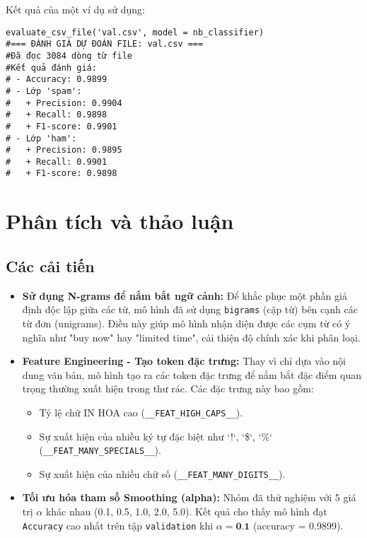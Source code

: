 Kết quả của một ví dụ sử dụng:
\begin{verbatim}
evaluate_csv_file('val.csv', model = nb_classifier)
#=== ĐÁNH GIÁ DỰ ĐOÁN FILE: val.csv ===
#Đã đọc 3084 dòng từ file
#Kết quả đánh giá:
# - Accuracy: 0.9899
# - Lớp 'spam':
#   + Precision: 0.9904
#   + Recall: 0.9898
#   + F1-score: 0.9901
# - Lớp 'ham':
#   + Precision: 0.9895
#   + Recall: 0.9901
#   + F1-score: 0.9898
\end{verbatim}

\section{Phân tích và thảo luận}

\subsection{Các cải tiến}
\begin{itemize}
    \item \textbf{Sử dụng N-grams để nắm bắt ngữ cảnh:} Để khắc phục một phần giả định độc lập giữa các từ, mô hình đã sử dụng \texttt{bigrams} (cặp từ) bên cạnh các từ đơn (unigrams). Điều này giúp mô hình nhận diện được các cụm từ có ý nghĩa như "buy now" hay "limited time", cải thiện độ chính xác khi phân loại.

    \item \textbf{Feature Engineering - Tạo token đặc trưng:} Thay vì chỉ dựa vào nội dung văn bản, mô hình tạo ra các token đặc trưng để nắm bắt đặc điểm quan trọng thường xuất hiện trong thư rác. Các đặc trưng này bao gồm:
    \begin{itemize}
        \item Tỷ lệ chữ IN HOA cao (\texttt{\_\_FEAT\_HIGH\_CAPS\_\_}).
        \item Sự xuất hiện của nhiều ký tự đặc biệt như `!`, `\$`, `\%` (\texttt{\_\_FEAT\_MANY\_SPECIALS\_\_}).
        \item Sự xuất hiện của nhiều chữ số (\texttt{\_\_FEAT\_MANY\_DIGITS\_\_}).
    \end{itemize}
    \item \textbf{Tối ưu hóa tham số Smoothing (alpha):} Nhóm đã thử nghiệm với 5 giá trị $\alpha$ khác nhau (0.1, 0.5, 1.0, 2.0, 5.0). Kết quả cho thấy mô hình đạt \texttt{Accuracy} cao nhất trên tập \texttt{validation} khi $\alpha = \textbf{0.1}$ (accuracy = 0.9899).
\end{itemize}

